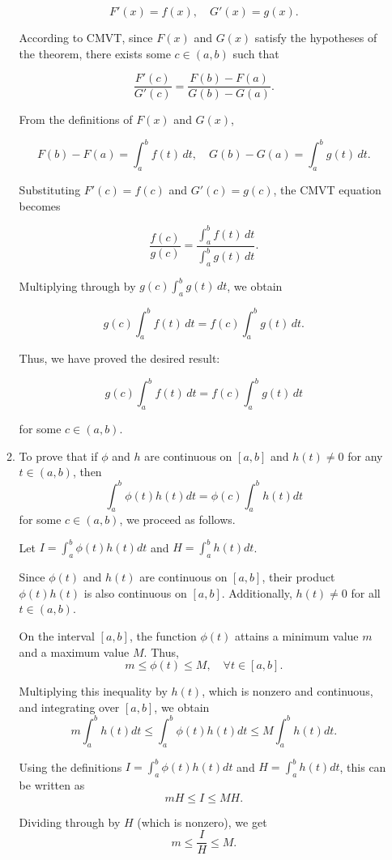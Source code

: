 \documentclass[12pt]{article}
\begin{document}
\begin{enumerate}
\begin{enumerate}
\[
F'(x) = f(x), \quad G'(x) = g(x).
\]

According to CMVT, since \( F(x) \) and \( G(x) \) satisfy the hypotheses of the theorem, there exists some \( c \in (a, b) \) such that

\[
\frac{F'(c)}{G'(c)} = \frac{F(b) - F(a)}{G(b) - G(a)}.
\]

From the definitions of \( F(x) \) and \( G(x) \),

\[
F(b) - F(a) = \int_a^b f(t) \, dt, \quad G(b) - G(a) = \int_a^b g(t) \, dt.
\]

Substituting \( F'(c) = f(c) \) and \( G'(c) = g(c) \), the CMVT equation becomes

\[
\frac{f(c)}{g(c)} = \frac{\int_a^b f(t) \, dt}{\int_a^b g(t) \, dt}.
\]

Multiplying through by \( g(c) \int_a^b g(t) \, dt \), we obtain

\[
g(c) \int_a^b f(t) \, dt = f(c) \int_a^b g(t) \, dt.
\]

Thus, we have proved the desired result:

\[
g(c) \int_a^b f(t) \, dt = f(c) \int_a^b g(t) \, dt
\]

for some \( c \in (a, b) \).


\item 
To prove that if $\phi$ and $h$ are continuous on $[a, b]$ and $h(t) \neq 0$ for any $t \in (a, b)$, then
\[
\int_a^b \phi(t)h(t)dt = \phi(c)\int_a^b h(t)dt
\]
for some $c \in (a, b)$, we proceed as follows.

Let $I = \int_a^b \phi(t)h(t)dt$ and $H = \int_a^b h(t)dt$.

Since $\phi(t)$ and $h(t)$ are continuous on $[a, b]$, their product $\phi(t)h(t)$ is also continuous on $[a, b]$. Additionally, $h(t) \neq 0$ for all $t \in (a, b)$.

On the interval $[a, b]$, the function $\phi(t)$ attains a minimum value $m$ and a maximum value $M$. Thus,
\[
m \leq \phi(t) \leq M, \quad \forall t \in [a, b].
\]

Multiplying this inequality by $h(t)$, which is nonzero and continuous, and integrating over $[a, b]$, we obtain
\[
m \int_a^b h(t)dt \leq \int_a^b \phi(t)h(t)dt \leq M \int_a^b h(t)dt.
\]

Using the definitions $I = \int_a^b \phi(t)h(t)dt$ and $H = \int_a^b h(t)dt$, this can be written as
\[
mH \leq I \leq MH.
\]

Dividing through by $H$ (which is nonzero), we get
\[
m \leq \frac{I}{H} \leq M.
\]


\end{enumerate}
\end{enumerate}
\end{document}
